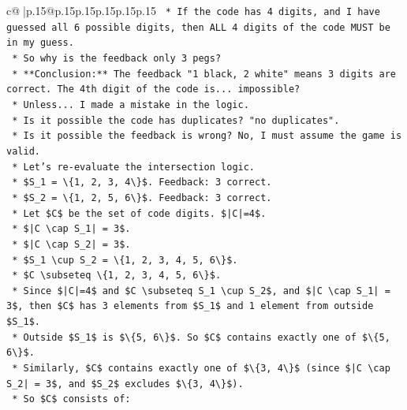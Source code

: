 \documentclass{article}
\begin{document}
{\begin{supertabular}{c@{$\;$}|p{.15\linewidth}@{}p{.15\linewidth}p{.15\linewidth}p{.15\linewidth}p{.15\linewidth}p{.15\linewidth}}
{{{\texttt{        *   If the code has 4 digits, and I have guessed all 6 possible digits, then ALL 4 digits of the code MUST be in my guess.} \\
\texttt{        *   So why is the feedback only 3 pegs?} \\
\texttt{        *   **Conclusion:** The feedback "1 black, 2 white" means 3 digits are correct. The 4th digit of the code is... impossible?} \\
\texttt{        *   Unless... I made a mistake in the logic.} \\
\texttt{        *   Is it possible the code has duplicates? "no duplicates".} \\
\texttt{        *   Is it possible the feedback is wrong? No, I must assume the game is valid.} \\
\texttt{        *   Let's re{-}evaluate the intersection logic.} \\
\texttt{        *   \$S\_1 = \textbackslash{}\{1, 2, 3, 4\textbackslash{}\}\$. Feedback: 3 correct.} \\
\texttt{        *   \$S\_2 = \textbackslash{}\{1, 2, 5, 6\textbackslash{}\}\$. Feedback: 3 correct.} \\
\texttt{        *   Let \$C\$ be the set of code digits. \$|C|=4\$.} \\
\texttt{        *   \$|C \textbackslash{}cap S\_1| = 3\$.} \\
\texttt{        *   \$|C \textbackslash{}cap S\_2| = 3\$.} \\
\texttt{        *   \$S\_1 \textbackslash{}cup S\_2 = \textbackslash{}\{1, 2, 3, 4, 5, 6\textbackslash{}\}\$.} \\
\texttt{        *   \$C \textbackslash{}subseteq \textbackslash{}\{1, 2, 3, 4, 5, 6\textbackslash{}\}\$.} \\
\texttt{        *   Since \$|C|=4\$ and \$C \textbackslash{}subseteq S\_1 \textbackslash{}cup S\_2\$, and \$|C \textbackslash{}cap S\_1| = 3\$, then \$C\$ has 3 elements from \$S\_1\$ and 1 element from outside \$S\_1\$.} \\
\texttt{        *   Outside \$S\_1\$ is \$\textbackslash{}\{5, 6\textbackslash{}\}\$. So \$C\$ contains exactly one of \$\textbackslash{}\{5, 6\textbackslash{}\}\$.} \\
\texttt{        *   Similarly, \$C\$ contains exactly one of \$\textbackslash{}\{3, 4\textbackslash{}\}\$ (since \$|C \textbackslash{}cap S\_2| = 3\$, and \$S\_2\$ excludes \$\textbackslash{}\{3, 4\textbackslash{}\}\$).} \\
\texttt{        *   So \$C\$ consists of:} \\
}}}
\end{supertabular}}
\end{document}
